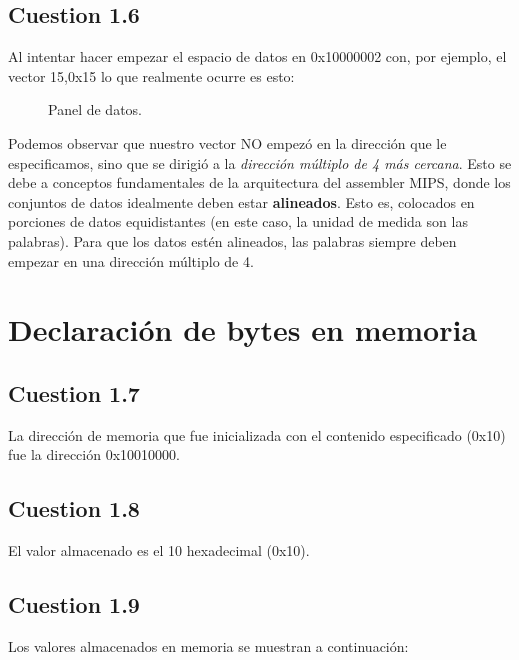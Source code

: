 \documentclass[11pt]{article}
\begin{document}
\begin{large}
\begin{flushleft}
\subsection*{Cuestion 1.6}
Al intentar hacer empezar el espacio de datos en 0x10000002 con, por ejemplo, el vector 15,0x15 lo que realmente ocurre es esto:

\begin{figure}[H]
    \centering
    \caption{Panel de datos.}
    \label{fig:my_label}
\end{figure}

Podemos observar que nuestro vector NO empezó en la dirección que le especificamos, sino que se dirigió a la \textit{dirección múltiplo de 4 más cercana}. Esto se debe a conceptos fundamentales de la arquitectura del assembler MIPS, donde los conjuntos de datos idealmente deben estar \textbf{alineados}. Esto es, colocados en porciones de datos equidistantes (en este caso, la unidad de medida son las palabras). Para que los datos estén alineados, las palabras siempre deben empezar en una dirección múltiplo de 4.

\section*{Declaración de bytes en memoria}

\subsection*{Cuestion 1.7}
La dirección de memoria que fue inicializada con el contenido especificado (0x10) fue la dirección 0x10010000.

\subsection*{Cuestion 1.8}
El valor almacenado es el 10 hexadecimal (0x10).

\subsection*{Cuestion 1.9}
Los valores almacenados en memoria se muestran a continuación:


\end{flushleft}
\end{large}
\end{document}
